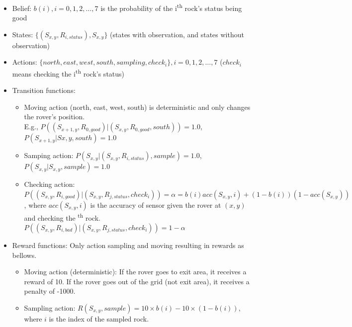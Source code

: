 \documentclass{article}
\begin{document}
\begin{itemize}

\item Belief: $b(i), i=0,1,2,\dots,7$ is the probability of the 
i\textsuperscript{th} rock's status being good

\item States: $\{(S_{x,y},R_{i,status}), S_{x,y}\}$ (states with observation, and 
states without observation)

\item Actions: $\{north, east, west, south, sampling, check_i\}, i=0,1,2,\dots,7$ 
($check_i$ means checking the i\textsuperscript{th} rock's status)

\item Transition functions:
	\begin{itemize}
	\item Moving action (north, east, west, south) is deterministic and only changes
	the rover's position.\\ 
	E.g., $P( (S_{x+1,y},R_{0,good}) | (S_{x,y},R_{0,good}, south) ) = 1.0$,\\
	$P( S_{x+1,y} | S{x,y}, south) = 1.0$
	\item Samping action: $P( S_{x,y} | (S_{x,y}, R_{i,status}), sample) = 1.0$,\\
	$P( S_{x,y} | S_{x,y}, sample) = 1.0$
	\item Checking action:\\
	$P( (S_{x,y}, R_{i,good}) | (S_{x,y}, R_{j,status}, check_i) ) = \alpha = b(i)acc(S_{x,y}, i) + (1 - b(i))(1 - acc(S_{x,y}))$, where $acc(S_{x,y},i)$ is the accuracy 
	of sensor given the rover at $(x,y)$ and checking the \textsuperscript{th} rock.\\
	$P( (S_{x,y}, R_{i,bad}) | (S_{x,y}, R_{j,status}, check_i) ) = 1 - \alpha$
	\end{itemize}

\item Reward functions: Only action sampling and moving resulting in rewards as bellows.
	\begin{itemize}
	\item Moving action (deterministic): If the rover goes to exit area, it receives a 
	reward of 10. If the rover goes out of the grid (not exit area), it receives a
	penalty of -1000.
	\item Sampling action: $R(S_{x,y}, sample) = 10 \times b(i) - 10 \times (1 - b(i))$,
	where $i$ is the index of the sampled rock.
	\end{itemize}

\end{itemize}
\end{document}

